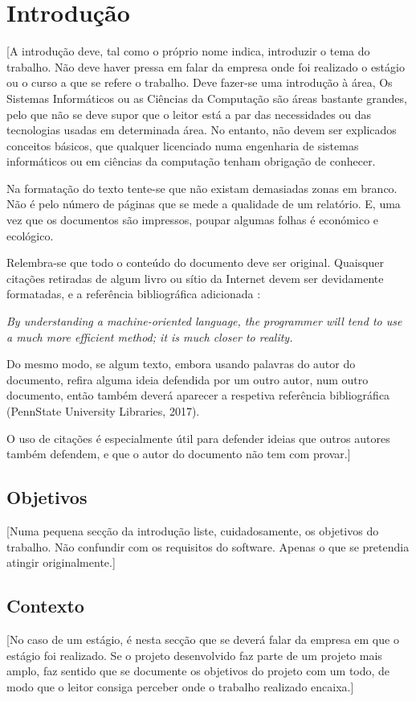 
\chapter{Introdução}

 [A introdução deve, tal como o próprio nome indica, introduzir o tema do trabalho. Não deve haver pressa em falar da empresa onde foi realizado o estágio ou o curso a que se refere o trabalho. Deve fazer-se uma introdução à área, Os Sistemas Informáticos ou as Ciências da Computação são áreas bastante grandes, pelo que não se deve supor que o leitor está a par das necessidades ou das tecnologias usadas em determinada área. No entanto, não devem ser explicados conceitos básicos, que qualquer licenciado numa engenharia de sistemas informáticos ou em ciências da computação tenham obrigação de conhecer.

 Na formatação do texto tente-se que não existam demasiadas zonas em branco. Não é pelo número de páginas que se mede a qualidade de um relatório. E, uma vez que os documentos são impressos, poupar algumas folhas é económico e ecológico. 

 Relembra-se que todo o conteúdo do documento deve ser original. Quaisquer citações retiradas de algum livro ou sítio da Internet devem ser devidamente formatadas, e a referência bibliográfica adicionada \citep{knuth1973}:
 
 \emph{By understanding a machine-oriented language, the programmer will tend to use a much more efficient method; it is much closer to reality. }

 Do mesmo modo, se algum texto, embora usando palavras do autor do documento, refira alguma ideia defendida por um outro autor, num outro documento, então também deverá aparecer a respetiva referência bibliográfica (PennState University Libraries, 2017). 
 
 

 O uso de citações é especialmente útil para defender ideias que outros autores também defendem, e que o autor do documento não tem com provar.] 

\section{Objetivos}
[Numa pequena secção da introdução liste, cuidadosamente, os objetivos do trabalho. Não confundir com os requisitos do software. Apenas o que se pretendia atingir originalmente.] 
\section{Contexto}
[No caso de um estágio, é nesta secção que se deverá falar da empresa em que o estágio foi realizado. Se o projeto desenvolvido faz parte de um projeto mais amplo, faz sentido que se documente os objetivos do projeto com um todo, de modo que o leitor consiga perceber onde o trabalho realizado encaixa.] 
